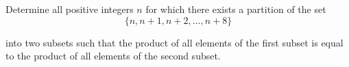 Determine all positive integers $n$ for which there exists a partition of the set\[\{n,n+1,n+2,\ldots ,n+8\}\]

into two subsets such that the product of all elements of the first subset is equal to the product of all elements of the second subset.